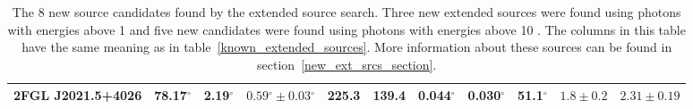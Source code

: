 \documentclass[12pt,preprint]{aastex}
\newcommand{\gev}{\text{GeV}\xspace}
\renewcommand{\deg}{\ensuremath{^\circ}\xspace}
\begin{document}
\begin{table}
\begin{centering}
\begin{tabular}{l|rrrrrrrrrr}
      2FGL J2021.5+4026    &      78.17\deg &       2.19\deg & $  0.59\deg \pm   0.03\deg$ &      225.3 &      139.4 &  0.044\deg &  0.030\deg &   51.1\deg & $    1.8 \pm     0.2$ & $   2.31 \pm    0.19$ \\
      \hline
    \end{tabular}
    \caption{The 8 new source candidates found by the extended source
    search. Three new extended sources were found using photons with
    energies above 1 \gev and five new candidates were found using photons
    with energies above 10 \gev.  The columns in this table have the same
    meaning as in table~\ref{known_extended_sources}.  More information
    about these sources can be found in section~\ref{new_ext_srcs_section}.
    }
    \label{new_ext_srcs_table}
  \end{centering}
\end{table}
\end{document}
